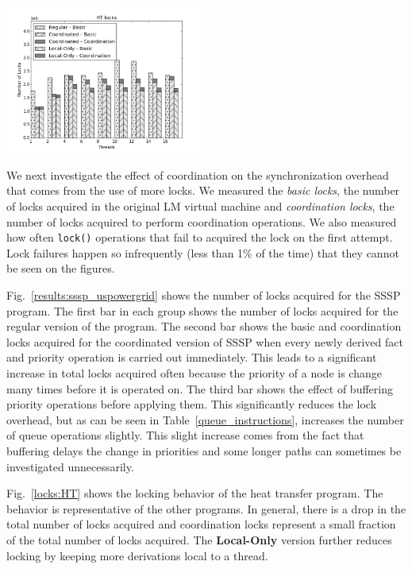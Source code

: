 \begin{topfig}
   \begin{center}
      \includegraphics[width=6.5cm]{results/locks/ht-locks.png}
   \end{center}
\end{topfig}

We next investigate the effect of coordination on the synchronization
overhead that comes from the use of more locks.  We measured the
\emph{basic locks}, the number of locks acquired
in the original LM virtual machine and \emph{coordination locks}, the
number of locks acquired to perform coordination operations.  We also
measured how often \texttt{lock()} operations that fail to acquired
the lock on the first attempt.  Lock failures happen so infrequently
(less than 1\% of the time) that they cannot be seen on the figures.

Fig.~\ref{results:sssp_uspowergrid} shows the number of locks acquired
for the SSSP program.  The first bar in each group shows the number of
locks acquired for the regular version of the program.  The
second bar shows the basic and coordination locks acquired for the coordinated
version of SSSP when every newly derived fact and priority operation is carried out
immediately.  This leads to a significant increase in total locks
acquired often because the priority of a node is change many times
before it is operated on.  The third bar shows the effect of buffering
priority operations before applying them.  This significantly reduces
the lock overhead, but as can be seen in
Table~\ref{queue_instructions}, increases the number of queue operations
slightly.  This slight increase comes from the fact that buffering
delays the change in priorities and some longer paths can sometimes be
investigated unnecessarily.

Fig.~\ref{locks:HT} shows the locking behavior of the heat transfer
program.  The behavior is representative of the other programs. In general, there
is a drop in the total number of locks acquired and coordination locks
represent a small fraction of the total number of locks acquired.  The \textbf{Local-Only}
version further reduces locking by keeping more derivations local
to a thread.

